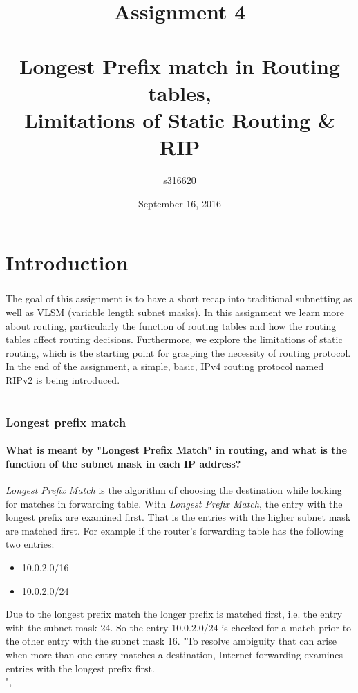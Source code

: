 \documentclass{article}
\author{s316620 
	\\ }
\title{\textbf{Assignment 4}\\
	\\ Longest Prefix match in Routing tables,
	\\ Limitations of Static Routing \& RIP \\}
\date{September 16, 2016}
\begin{document}
\maketitle
\newpage

\part*{Introduction}
\section*{}
The goal of this assignment is to have a short recap into traditional subnetting as well as
VLSM (variable length subnet masks). In this assignment we learn more about routing, particularly the function of routing tables and how the routing tables affect routing decisions.
Furthermore, we explore the limitations of static routing, which is the starting point for grasping the necessity of routing protocol. In the end of the assignment, a simple, basic, IPv4 routing protocol named RIPv2 is being introduced.

\part*{}
\section{Longest prefix match}

\subsection{ What is meant by "Longest Prefix Match" in routing, and what is the 
	function of the subnet mask in each IP address?}


{\textit{Longest Prefix Match}} is the algorithm of choosing the destination while looking for matches in forwarding table. With \textit{Longest Prefix Match}, the entry with the longest prefix are examined first.
That is the entries with the higher subnet mask are matched first. For example if the router's forwarding table has the following two entries:
	\begin{itemize}
	    \item 10.0.2.0/16
	    \item 10.0.2.0/24
	\end{itemize}
Due to the longest prefix match the longer prefix is matched first, i.e. the entry with the subnet mask 24. So the entry 10.0.2.0/24 is checked for a match prior to the other entry with the subnet mask 16. "To resolve ambiguity that can arise when more than one entry matches a destination, Internet forwarding examines entries with the  longest prefix first.\\",%
\end{document}
